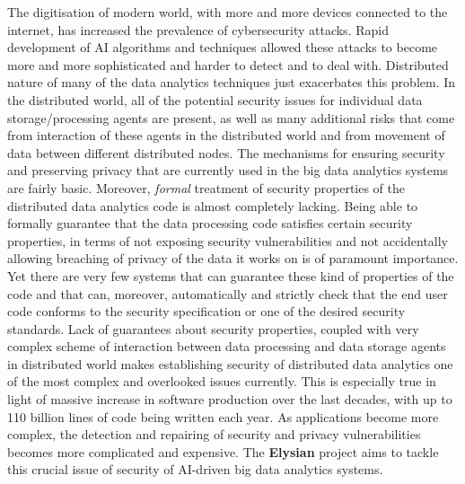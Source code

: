 \documentclass[a4paper,11pt]{article}
\newcommand{\project}[1]{\textbf{#1}\xspace}
\newcommand{\SECURITY}{\project{Elysian}}
\newcommand{\TheProject}{\SECURITY}
\begin{document}
The digitisation of modern world, with more and more devices connected to the internet, has increased the prevalence of cybersecurity attacks. Rapid development of AI algorithms and techniques allowed these attacks to become more and more sophisticated and harder to detect and to deal with. Distributed nature of many of the data analytics techniques just exacerbates this problem. In the distributed world, all of the potential security issues for individual data storage/processing agents are present, as well as many additional risks that come from interaction of these agents in the distributed world and from movement of data between different distributed nodes. The mechanisms for ensuring security and preserving privacy that are currently used in the big data analytics systems are fairly basic. Moreover, \emph{formal} treatment of security properties of the distributed data analytics code is almost completely lacking. Being able to formally guarantee that the data processing code satisfies certain security properties, in terms of not exposing security vulnerabilities and not accidentally allowing breaching of privacy of the data it works on is of paramount importance. Yet there are very few systems that can guarantee these kind of properties of the code and that can, moreover, automatically and strictly check that the end user code conforms to the security specification or one of the desired security standards. Lack of guarantees about security properties, coupled with very complex scheme of interaction between data processing and data storage agents in distributed world makes establishing security of distributed data analytics one of the most complex and overlooked issues currently. This is especially true in light of massive increase in software production over the last decades, with up to 110 billion lines of code being written each year. As applications become more complex, the detection and repairing of security and privacy vulnerabilities becomes more complicated and expensive. The \TheProject{} project aims to tackle this crucial issue of security of AI-driven big data analytics systems.
\end{document}
